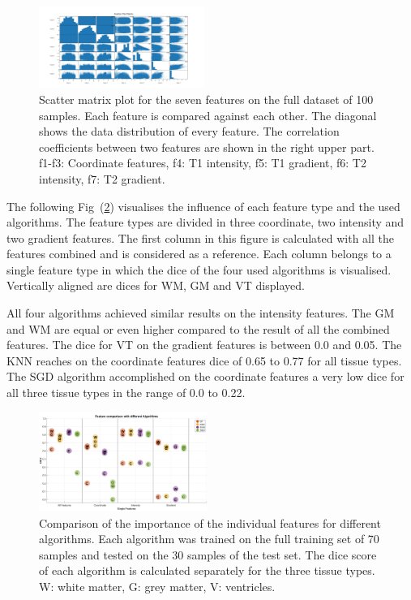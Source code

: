 \documentclass[journal]{IEEEtran}
\begin{document}
\begin{figure}[h]
	\centering
	\includegraphics[width=0.48\textwidth]{images/ScatterPlotMatrix}
	\caption{Scatter matrix plot for the seven features on the full dataset of 100 samples. Each feature is compared against each other. The diagonal shows the data distribution of every feature. The correlation coefficients between two features are shown in the right upper part. f1-f3: Coordinate features, f4: T1 intensity, f5: T1 gradient, f6: T2 intensity, f7: T2 gradient. }
	\label{scatterplot}
\end{figure}

The following Fig~(\ref{FeatEval}) visualises the influence of each feature type and the used algorithms. The feature types are divided in three coordinate, two intensity and two gradient features. The first column in this figure is calculated with all the features combined and is considered as a reference. Each column belongs to a single feature type in which the dice of the four used algorithms is visualised. Vertically aligned are dices for WM, GM and VT displayed.

All four algorithms achieved similar results on the intensity features. The GM and WM are equal or even higher compared to the result of all the combined features. The dice for VT on the gradient features is between 0.0 and 0.05. The KNN reaches on the coordinate features dice of 0.65 to 0.77 for all tissue types. The SGD algorithm accomplished on the coordinate features a very low dice for all three tissue types in the range of 0.0 to 0.22.
\begin{figure}[h]
	\centering
	\includegraphics[width=0.49\textwidth]{images/FeatureEvaluation}
	\caption{Comparison of the importance of the individual features for different algorithms. Each algorithm was trained on the full training set of 70 samples and tested on the 30 samples of the test set. The dice score of each algorithm is calculated separately for the three tissue types. W: white matter, G: grey matter, V: ventricles.}
	\label{FeatEval} 
\end{figure}
\end{document}
